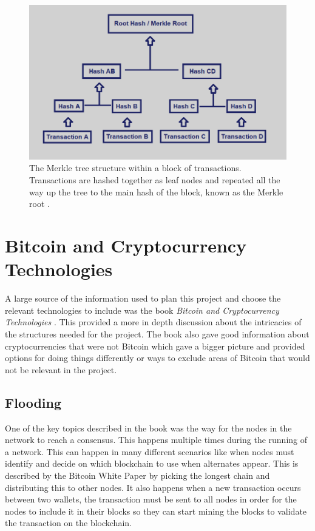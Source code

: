 \documentclass{l4proj}
\begin{document}
\begin{figure}
    \centering
    \includegraphics[width=0.7\linewidth]{images/merkle-tree.png}    

    \caption{
        The Merkle tree structure within a block of transactions. Transactions are hashed together as leaf nodes
        and repeated all the way up the tree to the main hash of the block, known as the Merkle root \citep{merkleimage}.
    }
    \label{fig:merkle}
\end{figure}

\section{Bitcoin and Cryptocurrency Technologies}
A large source of the information used to plan this project and choose the relevant technologies to include was the
book \emph{Bitcoin and Cryptocurrency Technologies} \citep{narayanan2016bitcoin}. This provided a more in depth discussion
about the intricacies of the structures needed for the project. The book also gave good information about cryptocurrencies
that were not Bitcoin which gave a bigger picture and provided options for doing things differently or ways to 
exclude areas of Bitcoin that would not be relevant in the project.

\subsection{Flooding}
One of the key topics described in the book was the way for the nodes in the network to reach a consensus. This happens
multiple times during the running of a network. This can happen in many different scenarios like when 
nodes must identify and decide on which blockchain to use when alternates appear. This is described by the Bitcoin White 
Paper by picking the longest chain and distributing this to other nodes. It also happens when a new transaction occurs 
between two wallets, the transaction must be sent to all nodes in order for the nodes to include it in their blocks so 
they can start mining the blocks to validate the transaction on the blockchain.
\end{document}
